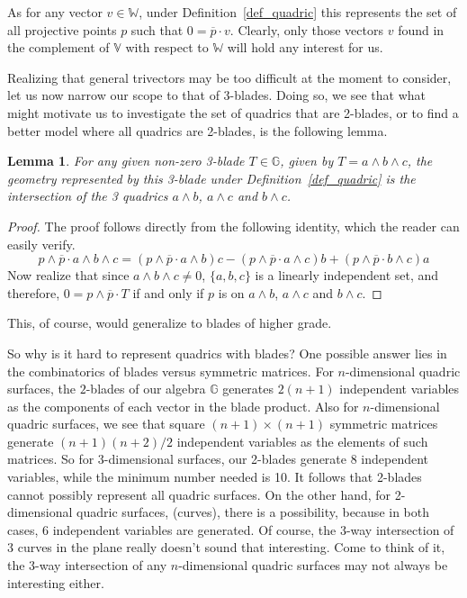 \documentclass{ecgd-l}
\newcommand{\G}{\mathbb{G}}
\newcommand{\V}{\mathbb{V}}
\newcommand{\W}{\mathbb{W}}
\newtheorem{lemma}[theorem]{Lemma}
\theoremstyle{definition}
\theoremstyle{remark}
\numberwithin{equation}{section}
\begin{document}
As for any vector $v\in\W$, under Definition~\ref{def_quadric} this represents the set of all
projective points $p$ such that $0=\overline{p}\cdot v$.  Clearly, only those vectors $v$ found
in the complement of $\V$ with respect to $\W$ will hold any interest for us.

Realizing that general trivectors may be too difficult at the moment to consider,
let us now narrow our scope to that of 3-blades.  Doing so, we see that
what might motivate us to investigate the set of quadrics that are 2-blades, or to find
a better model where all quadrics are 2-blades, is the following lemma.
\begin{lemma}
For any given non-zero 3-blade $T\in\G$, given by $T=a\wedge b\wedge c$, the
geometry represented by this 3-blade under Definition~\ref{def_quadric} is the intersection
of the 3 quadrics $a\wedge b$, $a\wedge c$ and $b\wedge c$.
\end{lemma}
\begin{proof}
The proof follows directly from the following identity, which the reader can easily verify.
\begin{equation}
p\wedge\overline{p}\cdot a\wedge b\wedge c
 = (p\wedge\overline{p}\cdot a\wedge b)c
 - (p\wedge\overline{p}\cdot a\wedge c)b
 + (p\wedge\overline{p}\cdot b\wedge c)a
\end{equation}
Now realize that since $a\wedge b\wedge c\neq 0$, $\{a,b,c\}$ is a linearly
independent set, and therefore, $0=p\wedge\overline{p}\cdot T$ if and
only if $p$ is on $a\wedge b$, $a\wedge c$ and $b\wedge c$.
\end{proof}
This, of course, would generalize to blades of higher grade.

So why is it hard to represent quadrics with blades?  One possible answer lies
in the combinatorics of blades versus symmetric matrices.  For $n$-dimensional
quadric surfaces, the $2$-blades of our algebra $\G$ generates $2(n+1)$
independent variables as the components of each vector in the blade product.
Also for $n$-dimensional quadric surfaces, we see that square $(n+1)\times(n+1)$
symmetric matrices generate $(n + 1)(n+2)/2$ independent variables as the
elements of such matrices.  So for
3-dimensional surfaces, our 2-blades generate 8 independent variables, while
the minimum number needed is 10.  It follows that 2-blades cannot possibly
represent all quadric surfaces.  On the other hand, for 2-dimensional
quadric surfaces, (curves), there is a possibility, because in both cases,
6 independent variables are generated.
Of course, the 3-way intersection of 3 curves in the plane really doesn't sound that interesting.
Come to think of it, the 3-way intersection of any $n$-dimensional quadric surfaces
may not always be interesting either.
\end{document}
